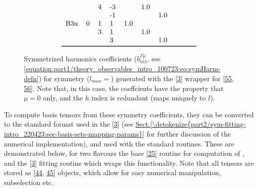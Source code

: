 \documentclass[letterpaper,table,10pt,english]{jupyterBook}
\begin{document}
\begin{figure}[htbp]
\begin{equation*}
\begin{split}
\begin{tabular}{llllllllll}
    &   & 4 & -3 &      &  1.0 &      &      &      &      \\
    &   &   & -1 &      &      &  1.0 &      &      &      \\
B3u & 0 & 1 &  1 &  1.0 &      &      &      &      &      \\
    &   & 3 &  1 &      &  1.0 &      &      &      &      \\
    &   &   &  3 &      &      &  1.0 &      &      &      \\
\bottomrule
\end{tabular}\end{split}
\end{equation*}\caption{Symmetrized harmonics coefficients (\(b_{hl\lambda}^{\Gamma\mu}\), see \eqref{equation:part1/theory_observables_intro_100723:eq:symHarm-defn}) for  symmetry (\(l_{max}=\)) generated with the  {[}\hyperlink{cite.backmatter/bibliography:id668}{3}{]} wrapper for  {[}\hyperlink{cite.backmatter/bibliography:id691}{55}, \hyperlink{cite.backmatter/bibliography:id692}{56}{]}. Note that, in this case, the coeffcients have the property that \(\mu=0\) only, and the \(h\) index is redundant (maps uniquely to \(l\)).}\label{\detokenize{part1/theory_tensor_formalism_160723:tab-d2hxlm}}\end{figure}

\sphinxAtStartPar
To compute basis tensors from these symmetry coefficients, they can be converted to the standard {\hyperref[\detokenize{backmatter/glossary:term-radial-matrix-elements}]{}} format used in the  {[}\hyperlink{cite.backmatter/bibliography:id668}{3}{]} (see \hyperref[\detokenize{part2/sym-fitting-intro_220423:sec-basis-sets-mapping-params}]{Sect.\@ \ref{\detokenize{part2/sym-fitting-intro_220423:sec-basis-sets-mapping-params}}} for further discussion of the numerical implementation), and used with the standard routines. These are demonstrated below, for two flavours \sphinxhyphen{} the base  {[}\hyperlink{cite.backmatter/bibliography:id597}{25}{]} routine for computation of {\hyperref[\detokenize{backmatter/glossary:term-AF}]{}}, and the  {[}\hyperlink{cite.backmatter/bibliography:id668}{3}{]} fitting routine which wraps this functionality. Note that all tensors are stored as  {[}\hyperlink{cite.backmatter/bibliography:id681}{44}, \hyperlink{cite.backmatter/bibliography:id953}{45}{]} objects, which allow for easy numerical manipulation, subselection etc.
\end{document}
